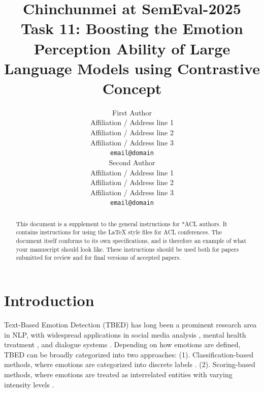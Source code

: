 \documentclass[11pt]{article}
\title{Chinchunmei at SemEval-2025 Task 11: Boosting the Emotion Perception Ability of Large Language Models using Contrastive Concept}
\author{First Author \\
  Affiliation / Address line 1 \\
  Affiliation / Address line 2 \\
  Affiliation / Address line 3 \\
  \texttt{email@domain} \\\And
  Second Author \\
  Affiliation / Address line 1 \\
  Affiliation / Address line 2 \\
  Affiliation / Address line 3 \\
  \texttt{email@domain} \\}
\begin{document}
\maketitle
\begin{abstract}
This document is a supplement to the general instructions for *ACL authors. It contains instructions for using the \LaTeX{} style files for ACL conferences.
The document itself conforms to its own specifications, and is therefore an example of what your manuscript should look like.
These instructions should be used both for papers submitted for review and for final versions of accepted papers.
\end{abstract}

\section{Introduction}

Text-Based Emotion Detection (TBED) has long been a prominent research area in NLP, with widespread applications in social media analysis \cite{kuamri2017real, salam2018emotion, cassab2020ontology}, mental health treatment \cite{kusal2021ai, krommyda2021experimental}, and dialogue systems \cite{liu2022dialogueein,ide2022building,hu2021dialoguecrn}. Depending on how emotions are defined, TBED can be broadly categorized into two approaches: (1). Classification-based methods, where emotions are categorized into discrete labels \cite{ekman1969repertoire,plutchik1982psycho}. (2). Scoring-based methods, where emotions are treated as interrelated entities with varying intensity levels \cite{russell1977evidence}. 
\end{document}
